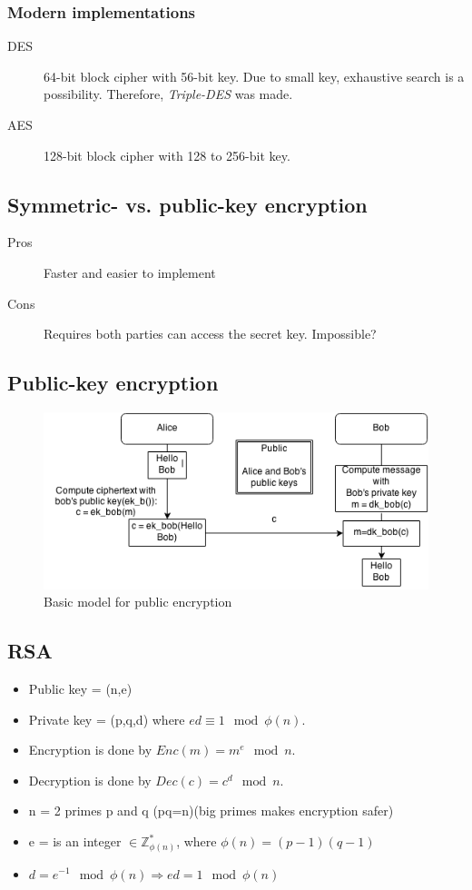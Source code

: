 \subsubsection*{Modern implementations}
\begin{description}
\item[DES] 64-bit block cipher with 56-bit key. Due to small key,
  exhaustive search is a possibility. Therefore, \emph{Triple-DES} was
  made.
\item[AES] 128-bit block cipher with 128 to 256-bit key.
\end{description}

\subsection{Symmetric- vs. public-key encryption}
\begin{description}
\item[Pros] Faster and easier to implement
\item[Cons] Requires both parties can access the secret key. Impossible?
\end{description}

\subsection{Public-key encryption}
\begin{figure}[H]
  \begin{centering}
    \includegraphics[width=15cm]{images/1-pub-enc}
    \caption{Basic model for public encryption}
  \end{centering}
  \label{fig:pub-enc}
\end{figure}
\subsection{RSA}
\begin{itemize}
\item Public key = (n,e)
\item Private key = (p,q,d) where $ed \equiv 1 \mod \phi (n)$.
\item Encryption is done by $Enc(m)= m^e \mod n$.
\item Decryption is done by $Dec(c)=c^d \mod n$.
\item n = 2 primes p and q (pq=n)(big primes makes encryption safer)
\item e = is an integer $\in \mathbb{Z}^*_{\phi (n)}$, where $\phi (n)=(p-1)(q-1)$
\item $d = e^{-1} \mod\phi (n)\Rightarrow ed=1\mod\phi (n)$
\end{itemize}

